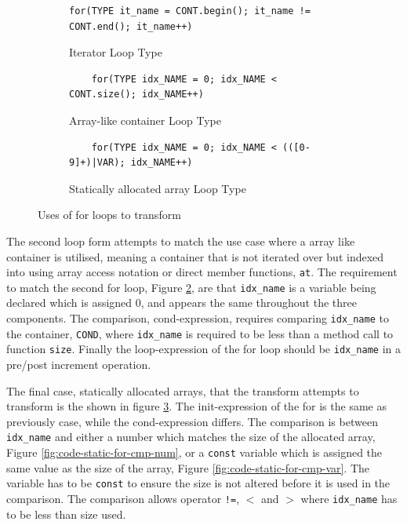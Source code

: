 \documentclass[bsc,frontabs,singlespacing,parskip,deptreport]{infthesis}
\begin{document}
\begin{figure}[h]
    \centering
    \begin{subfigure}[h]{\textwidth}
        \centering
        \begin{verbatim}
for(TYPE it_name = CONT.begin(); it_name != CONT.end(); it_name++)
        \end{verbatim}
        \caption{Iterator Loop Type }
        \label{fig:code-for-iter}
        \vspace{0.40cm}
    \end{subfigure}
    
    \begin{subfigure}[h]{\textwidth}
    \begin{verbatim}
    for(TYPE idx_NAME = 0; idx_NAME < CONT.size(); idx_NAME++)
    \end{verbatim}
    \caption{Array-like container Loop Type}
    \centering
    \label{fig:code-for-container}
    \end{subfigure}

    \begin{subfigure}[h]{\textwidth}
    \begin{verbatim}
    for(TYPE idx_NAME = 0; idx_NAME < (([0-9]+)|VAR); idx_NAME++)
    \end{verbatim}
    \caption{Statically allocated array Loop Type}
    \centering
    \label{fig:code-for-stat}
    \end{subfigure}
    
    \caption{Uses of for loops to transform}
    \label{fig:code-for-types}
\end{figure}


The second loop form attempts to match the use case where a array like container is utilised, meaning a container that is not iterated over but indexed into using array access notation or direct member functions, \texttt{at}. The requirement to match the second for loop, Figure \ref{fig:code-for-container}, are that \texttt{idx\_name} is a variable being declared which is assigned 0, and appears the same throughout the three components. The comparison, cond-expression, requires comparing \texttt{idx\_name} to the container, \texttt{COND}, where \texttt{idx\_name} is required to be less than a method call to function \texttt{size}. Finally the loop-expression of the for loop should be \texttt{idx\_name} in a pre/post increment operation.

The final case, statically allocated arrays, that the transform attempts to transform is the shown in figure \ref{fig:code-for-stat}. The init-expression of the for is the same as previously case, while the cond-expression differs. The comparison is between \texttt{idx\_name} and either a number which matches the size of the allocated array, Figure \ref{fig:code-static-for-cmp-num}, or a \texttt{const} variable which is assigned the same value as the size of the array, Figure \ref{fig:code-static-for-cmp-var}. The variable has to be \texttt{const} to ensure the size is not altered before it is used in the comparison. The comparison allows operator \texttt{!=}, $<$ and $>$ where \texttt{idx\_name} has to be less than size used. 
\end{document}
